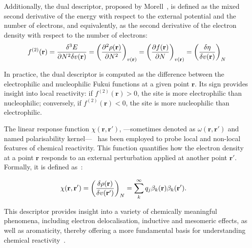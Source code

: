 Additionally, the dual descriptor, proposed by Morell~\cite{Morell2004}, is
defined as the mixed second derivative of the energy with respect to the
external potential and the number of electrons, and equivalently, as the second
derivative of the electron density with respect to the number of electrons:
%
\begin{align}
  f^{(2)}(\mathbf{r}) = \frac{\delta^3E}{\partial N^2\delta v(\mathbf{r})} =
    \left(\pdv[2]{\rho(\mathbf{r})}{N}\right)_{v(\mathbf{r})} =
    \left(\pdv{f(\mathbf{r})}{N}\right)_{v(\mathbf{r})} =
    \left(\fdv{\eta}{v(\mathbf{r})}\right)_N
\end{align}

\newpage
In practice, the dual descriptor is computed as the difference between the
electrophilic and nucleophilic Fukui functions at a given point $\mathbf{r}$. Its
sign provides insight into local reactivity: if $f^{(2)}(\mathbf{r}) > 0$, the
site is more electrophilic than nucleophilic; conversely, if $f^{(2)}(\mathbf{r})
< 0$, the site is more nucleophilic than electrophilic.

The linear response function $\chi(\mathbf{r}, \mathbf{r}')$, ---sometimes
denoted as $\omega(\mathbf{r}, \mathbf{r}')$ and named polarisability
kernel---~\cite{Langenaeker2001} has been employed to probe local and non-local
features of chemical reactivity. This function quantifies how the electron
density at a point $\mathbf{r}$ responds to an external perturbation applied at
another point $\mathbf{r}'$. Formally, it is defined as~\cite{Gzquez2021}:

\begin{align}
  \chi(\mathbf{r},\mathbf{r}') &=
    \left(\fdv{\rho(\mathbf{r})}{v(\mathbf{r}')}\right)_{N}
    = \sum_{k}^\infty q_{j} \beta_k (\mathbf{r})\beta_k (\mathbf{r}').
\end{align}

This descriptor provides insight into a variety of chemically meaningful
phenomena, including electron delocalisation, inductive and mesomeric effects,
as well as aromaticity, thereby offering a more fundamental basis for
understanding chemical reactivity~\cite{Geerlings2003}.

